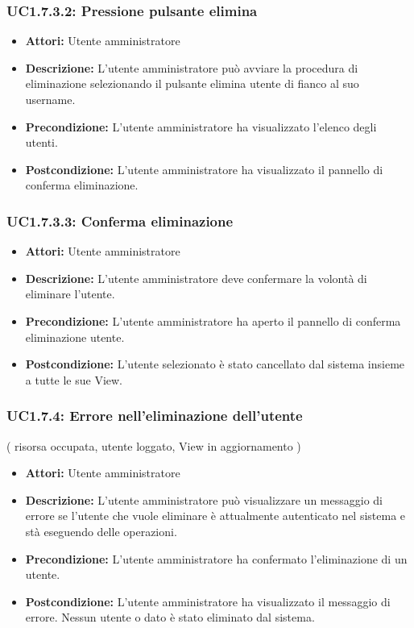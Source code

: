 \subsubsection{UC1.7.3.2: Pressione pulsante elimina}

\begin{itemize}
    \item \textbf{Attori:} Utente amministratore
    \item \textbf{Descrizione:} L'utente amministratore può avviare la procedura di eliminazione selezionando il pulsante elimina utente di fianco al suo username.
    \item \textbf{Precondizione:} L'utente amministratore ha visualizzato l'elenco degli utenti.
    \item \textbf{Postcondizione:} L'utente amministratore ha visualizzato il pannello di conferma eliminazione.
\end{itemize}

\subsubsection{UC1.7.3.3: Conferma eliminazione}

\begin{itemize}
    \item \textbf{Attori:} Utente amministratore
    \item \textbf{Descrizione:} L'utente amministratore deve confermare la volontà di eliminare l'utente.
    \item \textbf{Precondizione:} L'utente amministratore ha aperto il pannello di conferma eliminazione utente.
    \item \textbf{Postcondizione:} L'utente selezionato è stato cancellato dal sistema insieme a tutte le sue View.
\end{itemize}

\subsubsection{UC1.7.4: Errore nell’eliminazione dell'utente}
( risorsa occupata, utente loggato, View in aggiornamento )

\begin{itemize}
    \item \textbf{Attori:} Utente amministratore
    \item \textbf{Descrizione:} L'utente amministratore può visualizzare un messaggio di errore se l'utente che vuole eliminare è attualmente autenticato nel sistema e stà eseguendo delle operazioni.
    \item \textbf{Precondizione:} L'utente amministratore ha confermato l'eliminazione di un utente.
    \item \textbf{Postcondizione:} L'utente amministratore ha visualizzato il messaggio di errore. Nessun utente o dato è stato eliminato dal sistema.
\end{itemize}

